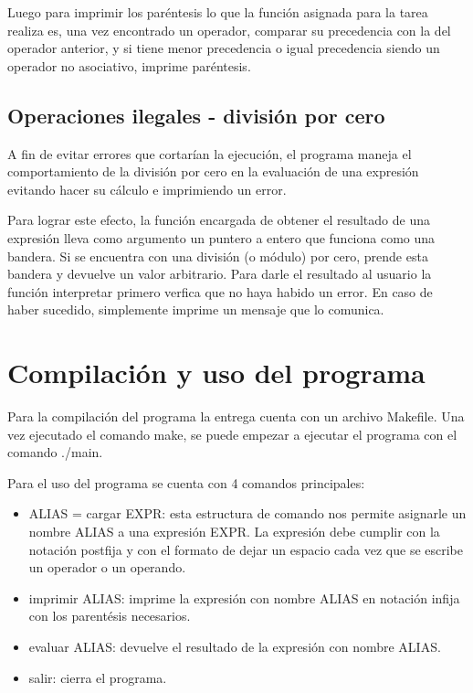 \documentclass[11pt]{article}
\begin{document}
Luego para imprimir los par\'entesis lo que la funci\'on asignada para la tarea realiza es, una vez encontrado un operador, comparar su precedencia con la del operador anterior, y si tiene menor precedencia o igual precedencia siendo un operador no asociativo, imprime par\'entesis.  

\vspace{20mm}

\subsection{Operaciones ilegales - divisi\'on por cero}
A fin de evitar errores que cortar\'ian la ejecución, el programa maneja el comportamiento de la divisi\'on por cero en la evaluaci\'on de una expresi\'on evitando hacer su c\'alculo e imprimiendo un error. 

Para lograr este efecto, la funci\'on encargada de obtener el resultado de una expresi\'on lleva como argumento un puntero a entero que funciona como una bandera. Si se encuentra con una divisi\'on (o m\'odulo) por cero, prende esta bandera y devuelve un valor arbitrario. Para darle el resultado al usuario la funci\'on interpretar primero verfica que no haya habido un error. En caso de haber sucedido, simplemente imprime un mensaje que lo comunica.

\section{Compilaci\'on y uso del programa}

Para la compilaci\'on del programa la entrega cuenta con un archivo Makefile. Una vez ejecutado el comando make, se puede empezar a ejecutar el programa con el comando ./main. 

Para el uso del programa se cuenta con 4 comandos principales: 

\begin{itemize}
    \item ALIAS = cargar EXPR: esta estructura de comando nos permite asignarle un nombre ALIAS a una expresi\'on EXPR. La expresi\'on debe cumplir con la notaci\'on postfija y con el formato de dejar un espacio cada vez que se escribe un operador o un operando. 
    \item imprimir ALIAS: imprime la expresi\'on con nombre ALIAS en notaci\'on infija con los parent\'esis necesarios. 
    \item evaluar ALIAS: devuelve el resultado de la expresi\'on con nombre ALIAS. 
    \item salir: cierra el programa. 
\end{itemize}
\end{document}
